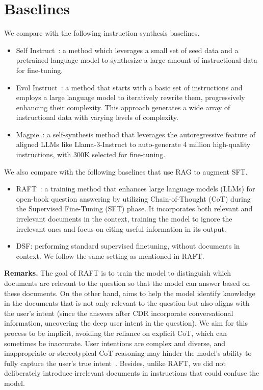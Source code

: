\section{Baselines}
\label{sec:baselinesDetailed}
We compare \ourmodel with the following instruction synthesis baselines.
\begin{itemize}
    \item Self Instruct~\cite{zhang2023self}: a method which leverages a small set of seed data and a pretrained language model to synthesize a large amount of instructional data for fine-tuning.
    \item Evol Instruct~\cite{Xu2023WizardLMEL}: a method that starts with a basic set of instructions and employs a large language model to iteratively rewrite them, progressively enhancing their complexity. This approach generates a wide array of instructional data with varying levels of complexity. 
    \item Magpie~\cite{xu2024magpie}: a self-synthesis method that leverages the autoregressive feature of aligned LLMs like Llama-3-Instruct to auto-generate 4 million high-quality instructions, with 300K selected for fine-tuning.
\end{itemize}
We also compare \ourmodel with the following baselines that use RAG to augment SFT. 
\begin{itemize}
    \item RAFT~\cite{zhang2024raft}: a training method that enhances large language models (LLMs) for open-book question answering by utilizing Chain-of-Thought (CoT) during the Supervised Fine-Tuning (SFT) phase. It incorporates both relevant and irrelevant documents in the context, training the model to ignore the irrelevant ones and focus on citing useful information in its output. 
    \item DSF: performing standard supervised finetuning, without documents in context. We follow the same setting as mentioned in RAFT.
\end{itemize}
\textbf{Remarks.} The goal of RAFT is to train the model to distinguish which documents are relevant to the question so that the model can answer based on these documents. On the other hand, \ourmodel aims to help the model identify knowledge in the documents that is not only relevant to the question but also aligns with the user's intent (since the answers after CDR incorporate conversational information, uncovering the deep user intent in the question). We aim for this process to be implicit, avoiding the reliance on explicit CoT, which can sometimes be inaccurate. User intentions are complex and diverse, and inappropriate or stereotypical CoT reasoning may hinder the model's ability to fully capture the user's true intent~\cite{turpin2023language}. Besides, unlike RAFT, we did not deliberately introduce irrelevant documents in instructions that could confuse the model.


